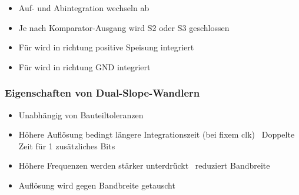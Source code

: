 \begin{minipage}[t]{0.48\columnwidth}
    \begin{itemize}
        \item Auf- und Abintegration wechseln ab
        \item Je nach Komparator-Ausgang wird S2 oder S3 geschlossen
    \end{itemize}
\end{minipage}
\hfill
\begin{minipage}[t]{0.48\columnwidth}
    \begin{itemize}
        \item Für  wird in richtung positive Speisung integriert
        \item Für  wird in richtung GND integriert
    \end{itemize}
\end{minipage}


\subsubsection{Eigenschaften von Dual-Slope-Wandlern}

\begin{minipage}[t]{0.48\columnwidth}
    \begin{itemize}
        \item Unabhängig von Bauteiltoleranzen
        \item Höhere Auflösung bedingt längere Integrationszeit (bei fixem clk) 
            \textrightarrow\ Doppelte Zeit für 1 zusätzliches Bits
    \end{itemize}
\end{minipage}
\hfill
\begin{minipage}[t]{0.48\columnwidth}
    \begin{itemize}
        \item Höhere Frequenzen werden stärker unterdrückt \textrightarrow\ reduziert Bandbreite
        \item Auflösung wird gegen Bandbreite getauscht
    \end{itemize}
\end{minipage}


